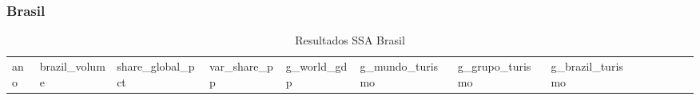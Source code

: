 \documentclass[
  portuguese,
  letterpaper,
  DIV=11,
  numbers=noendperiod]{scrartcl}
\begin{document}
\subsubsection{Brasil}\label{brasil}

\begin{longtable}[]{@{}
  >{\raggedleft\arraybackslash}p{}
  >{\raggedleft\arraybackslash}p{}
  >{\raggedleft\arraybackslash}p{}
  >{\raggedleft\arraybackslash}p{}
  >{\raggedleft\arraybackslash}p{}
  >{\raggedleft\arraybackslash}p{}
  >{\raggedleft\arraybackslash}p{}
  >{\raggedleft\arraybackslash}p{}
  >{\raggedleft\arraybackslash}p{}
  >{\raggedleft\arraybackslash}p{}
  >{\raggedleft\arraybackslash}p{}
  >{\raggedleft\arraybackslash}p{}
  >{\raggedleft\arraybackslash}p{}@{}}
\caption{Resultados SSA Brasil}\tabularnewline
\toprule\noalign{}
\begin{minipage}[b]{\linewidth}\raggedleft
ano
\end{minipage} & \begin{minipage}[b]{\linewidth}\raggedleft
brazil\_volume
\end{minipage} & \begin{minipage}[b]{\linewidth}\raggedleft
share\_global\_pct
\end{minipage} & \begin{minipage}[b]{\linewidth}\raggedleft
var\_share\_pp
\end{minipage} & \begin{minipage}[b]{\linewidth}\raggedleft
g\_world\_gdp
\end{minipage} & \begin{minipage}[b]{\linewidth}\raggedleft
g\_mundo\_turismo
\end{minipage} & \begin{minipage}[b]{\linewidth}\raggedleft
g\_grupo\_turismo
\end{minipage} & \begin{minipage}[b]{\linewidth}\raggedleft
g\_brazil\_turismo
\end{minipage} & \begin{minipage}[b]{\linewidth}\raggedleft

\end{minipage}
\end{longtable}
\end{document}
